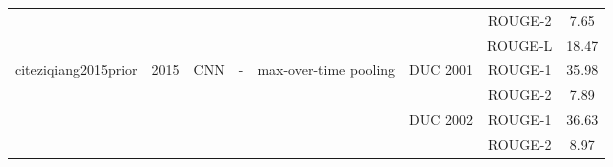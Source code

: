 \documentclass[12pt, a4paper, oneside]{report}
\begin{document}
\begin{tabular}{|c|c|c|c|c|c|cc|}
                                                                          &                       &                                   &                                         &                                                                                                        &                                       & \multicolumn{1}{c|}{ROUGE-2}                                                                                                       & 7.65   \\ \cline{7-8} 
                                                                          &                       &                                   &                                         &                                                                                                        &                                       & \multicolumn{1}{c|}{ROUGE-L}                                                                                                       & 18.47  \\ \hline
    \multirow{6}{*}{cite{ziqiang2015prior}}             & \multirow{6}{*}{2015} & \multirow{6}{*}{CNN}              & \multirow{6}{*}{-}                      & \multirow{6}{*}{max-over-time pooling}                                                                 & \multirow{2}{*}{DUC 2001}             & \multicolumn{1}{c|}{ROUGE-1}                                                                                                       & 35.98  \\ \cline{7-8} 
                                                                          &                       &                                   &                                         &                                                                                                        &                                       & \multicolumn{1}{c|}{ROUGE-2}                                                                                                       & 7.89   \\ \cline{6-8} 
                                                                          &                       &                                   &                                         &                                                                                                        & \multirow{2}{*}{DUC 2002}             & \multicolumn{1}{c|}{ROUGE-1}                                                                                                       & 36.63  \\ \cline{7-8} 
                                                                          &                       &                                   &                                         &                                                                                                        &                                       & \multicolumn{1}{c|}{ROUGE-2}                                                                                                       & 8.97   \\ \cline{6-8} 

\end{tabular}
\end{document}
